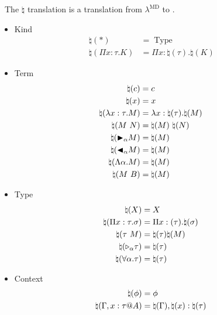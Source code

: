 \begin{definition}\
    The $\natural$ translation is a translation from $\lambda^\text{MD}$ to .
    \begin{multicols}{2}
        \begin{itemize}
            \item Kind
                \begin{align*}
                    \natural(*) &= \operatorname{Type} & \\
                    \natural(\Pi x:\tau.K) &= \Pi x:\natural(\tau).\natural(K) &
                \end{align*}
            \item Term
                \begin{align*}
                    \natural(c) &= c & \\
                    \natural(x) &= x & \\
                    \natural(\lambda x:\tau.M) &= \lambda x:\natural(\tau).\natural(M) & \\
                    \natural(M\ N) &= \natural(M)\ \natural(N)& \\
                    \natural({\mathop{\blacktriangleright}}_\alpha M) &= \natural(M) & \\
                    \natural({\mathop{\blacktriangleleft}}_\alpha M) &= \natural(M)& \\
                    \natural(\Lambda\alpha.M) &= \natural(M)& \\
                    \natural(M\ B) &= \natural(M) &
                \end{align*}
            \item Type
            \begin{align*}
                \natural(X) &= X & \\
                \natural(\Pi x:\tau.\sigma) &= \Pi x:(\tau). \natural(\sigma) & \\
                \natural(\tau\ M) &= \natural(\tau) \natural(M) & \\
                \natural({\mathop{\triangleright}}_\alpha \tau) &= \natural(\tau) & \\
                \natural(\forall \alpha.\tau) &= \natural(\tau) &
            \end{align*}
        \item Context
            \begin{align*}
                \natural(\phi) &= \phi & \\
                \natural(\G, x:\tau@A) &= \natural(\G), \natural(x):\natural(\tau) & \\

\end{align*}
\end{itemize}
\end{multicols}
\end{definition}

